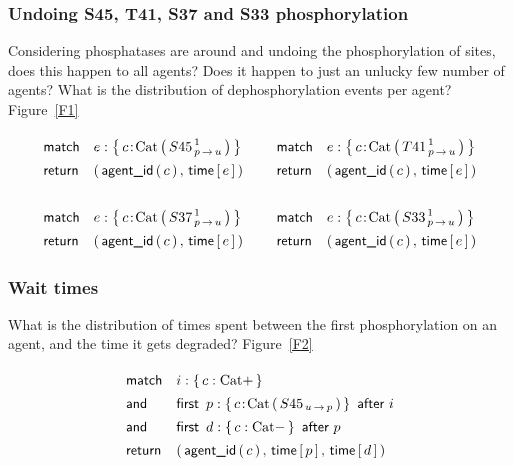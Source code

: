 
\subsubsection*{Undoing S45, T41, S37 and S33 phosphorylation}
Considering phosphatases are around and undoing the phosphorylation of
sites, does this happen to all agents? Does it happen to just an
unlucky few number of agents? What is the distribution of
dephosphorylation events per agent? Figure~\ref{F1}





\newcommand{\UndoQ}[1]{
\Query{
    \m{match} & e:\Set{ 
      \iAG{c}{\BetaCat}{{#1}^{\,1}_{\Trans{p}{u}}}
    } \\
    \m{return} & \Par{\AgentId{c},\, \Time{e}}
  }
}

\begin{small}
  \begin{equation*}
    \arraycolsep=7pt
    \begin{array}{cc}
      \UndoQ{S45} & \UndoQ{T41} \\ \\
      \UndoQ{S37} & \UndoQ{S33} \\
    \end{array}
  \end{equation*}
\end{small}


\subsubsection*{Wait times}

What is the distribution of times spent
between the first phosphorylation on an agent, and the time it gets
degraded? Figure~\ref{F2}


\begin{small}
\begin{equation}
  \Query{
    \m{match} & i:\Set{  c:\BetaCat+ } \\
    \m{and} & \FirstAfter{p:\Set{
        \iAG{c}{\BetaCat}{{S45}_{\Trans{u}{p}}}
    }}{i} \\
    \m{and} & \FirstAfter{ d:\Set{
        c:\BetaCat-
    } }{p} \\
    \m{return} & \Par{\AgentId{c},\, \Time{p},\, \Time{d}}
  } 
\end{equation}
\end{small}

